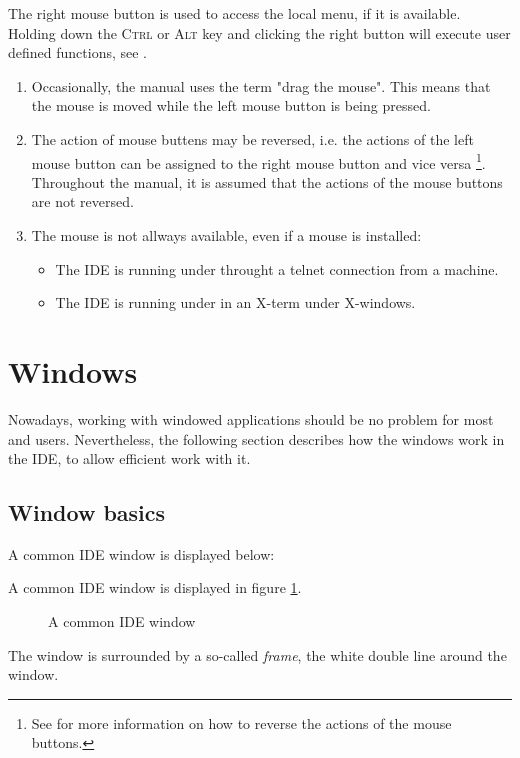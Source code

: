 The right mouse button is used to access the local menu, if
it is available. Holding down the \textsc{Ctrl} or \textsc{Alt} key and 
clicking the right button will execute user defined functions, 
see .

\begin{remark}
\begin{enumerate}
\item Occasionally, the manual uses the term "drag the mouse". This
means that the mouse is moved while the left mouse button is being 
pressed.
\item 
The action of mouse buttens may be reversed, i.e. the actions of the left
mouse button can be assigned to the right mouse button and vice versa  
\footnote{See  for more information on how to reverse the
actions of the mouse buttons.}. Throughout the manual, it is assumed 
that the actions of the mouse buttons are not reversed.
\item
The mouse is not allways available, even if a mouse is installed:
\begin{itemize}
\item The IDE is running under \linux throught a telnet connection from 
a \windows machine.
\item The IDE is running under \linux in an X-term under X-windows.
\end{itemize}
\end{enumerate}
\end{remark}

\section{Windows}
\label{se:windows}
Nowadays, working with windowed applications should be no problem for
most \windows and \linux users. Nevertheless, the following section 
describes how the windows work in the \fpc IDE, to allow efficient 
work with it.
%
%
\subsection{Window basics}
\label{se:windowbasics}
\begin{htmlonly}
A common IDE window is displayed  below:
\end{htmlonly}
\begin{latexonly}
A common IDE window is displayed in figure \ref{fig:idewin}.
\begin{figure}
\caption{A common IDE window}
\label{fig:idewin}
\ifpdf
{}
\else
{}
\fi
\end{figure}
\end{latexonly}
The window is surrounded by a so-called \emph{frame}, the white double
line around the window. 

